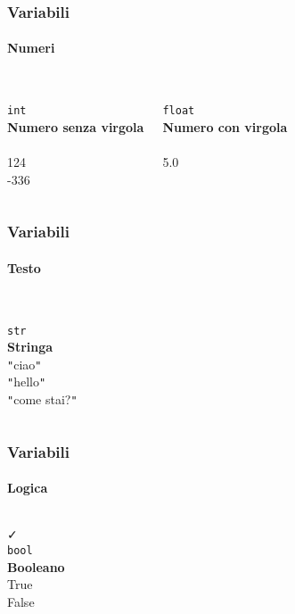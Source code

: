 \begin{contentframe}
    \frametitle{Variabili}
    \framesubtitle{Numeri}

    \begin{columns}
        \centering
        {\Huge\faCalculator}\\
        \bigskip
        \texttt{int}\\
        \textbf{Numero senza virgola}\\
        \\124\\-336

        \centering
        {\Huge\faCalculator}\\
        \bigskip
        \texttt{float}\\
        \textbf{Numero con virgola}\\
        \\5.0\\\bigskip
    \end{columns}
\end{contentframe}

\begin{contentframe}
    \frametitle{Variabili}
    \framesubtitle{Testo}

    \begin{columns}
        \centering
        {\Huge\faPen}\\
        \bigskip
        \texttt{str}\\
        \textbf{Stringa}\\
        \bigskip
        \texttt{"}ciao\texttt{"}\\
        \texttt{"}hello\texttt{"}\\
        \texttt{"}come stai?\texttt{"}
    \end{columns}
\end{contentframe}

\begin{contentframe}
    \frametitle{Variabili}
    \framesubtitle{Logica}

    \begin{columns}
        \centering
        {\Huge\faCheck}\\
        \bigskip
        \texttt{bool}\\
        \textbf{Booleano}\\
        \bigskip
        True\\False
    \end{columns}
\end{contentframe}

